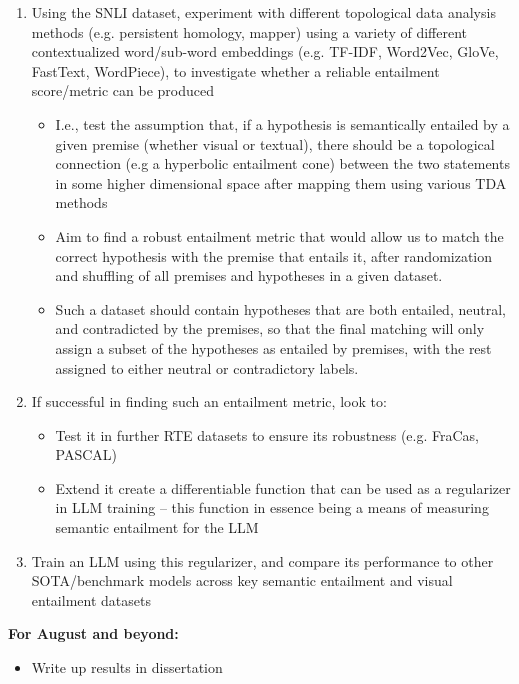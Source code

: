 \documentclass[12pt,twoside]{report}
\begin{document}
\begin{enumerate}[itemsep=0pt]
    \item Using the SNLI dataset, experiment with different topological data analysis methods (e.g. persistent homology, mapper) using a variety of different contextualized word/sub-word embeddings (e.g. TF-IDF, Word2Vec, GloVe, FastText, WordPiece), to investigate whether a reliable entailment score/metric can be produced
    \begin{itemize} [topsep=0pt, itemsep=0pt]
        \item I.e., test the assumption that, if a hypothesis is semantically entailed by a given premise (whether visual or textual), there should be a topological connection (e.g a hyperbolic entailment cone) between the two statements in some higher dimensional space after mapping them using various TDA methods
        \item Aim to find a robust entailment metric that would allow us to match the correct hypothesis with the premise that entails it, after randomization and shuffling of all premises and hypotheses in a given dataset. 
        \item Such a dataset should contain hypotheses that are both entailed, neutral, and contradicted by the premises, so that the final matching will only assign a subset of the hypotheses as entailed by premises, with the rest assigned to either neutral or contradictory labels.
    \end{itemize}
    \item If successful in finding such an entailment metric, look to:
    \begin{itemize}[topsep=0pt, itemsep=0pt]
        \item Test it in further RTE datasets to ensure its robustness (e.g. FraCas, PASCAL)
        \item Extend it create a differentiable function that can be used as a regularizer in LLM training – this function in essence being a means of measuring semantic entailment for the LLM
    \end{itemize} 
    \item Train an LLM using this regularizer, and compare its performance to other SOTA/benchmark models across key semantic entailment and visual entailment datasets
\end{enumerate}
\textbf{For August and beyond:}
\begin{itemize} [itemsep=0pt]
    \item Write up results in dissertation
\end{itemize}
 
\end{document}
